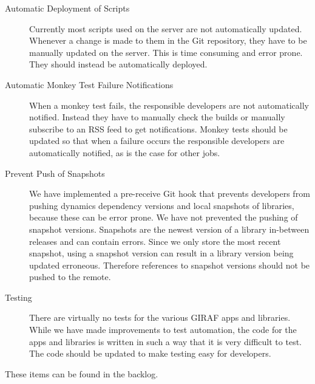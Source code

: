 \begin{description}
  \item[Automatic Deployment of Scripts] Currently most scripts used on the server are not automatically updated. Whenever a change is made to them in the Git repository, they have to be manually updated on the server. This is time consuming and error prone. They should instead be automatically deployed.
  \item[Automatic Monkey Test Failure Notifications] When a monkey test fails, the responsible developers are not automatically notified. Instead they have to manually check the builds or manually subscribe to an RSS feed to get notifications. Monkey tests should be updated so that when a failure occurs the responsible developers are automatically notified, as is the case for other jobs.
  \item[Prevent Push of Snapshots] We have implemented a pre-receive Git hook that prevents developers from pushing dynamics dependency versions and local snapshots of libraries, because these can be error prone. We have not prevented the pushing of snapshot versions. Snapshots are the newest version of a library in-between releases and can contain errors. Since we only store the most recent snapshot, using a snapshot version can result in a library version being updated erroneous. Therefore references to snapshot versions should not be pushed to the remote.
  \item[Testing] There are virtually no tests for the various GIRAF apps and libraries. While we have made improvements to test automation, the code for the apps and libraries is written in such a way that it is very difficult to test. The code should be updated to make testing easy for developers.
\end{description}

These items can be found in the backlog.